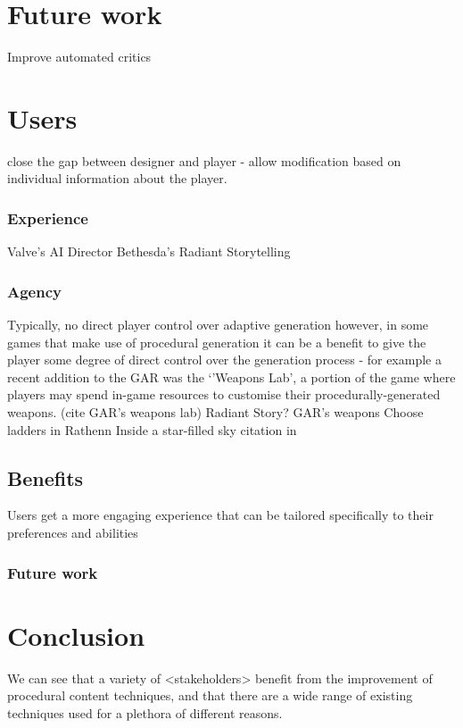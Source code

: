 \documentclass{acm_proc_article-sp}
\begin{document}
\section{Future work}
Improve automated critics \cite{hendrikx2012procedural}

\newpage
\section{Users}
close the gap between designer and player - allow modification based on individual information about the player.

\cite{sorenson2010towards}

\subsubsection{Experience}
Valve's AI Director \cite{valve}
Bethesda's Radiant Storytelling \cite{radiant}
\subsubsection{Agency}
Typically, no direct player control over adaptive generation \cite{hamlet}
however, in some games that make use of procedural generation it can be a benefit to give the player some degree of direct control over the generation process - for example a recent addition to the GAR was the `'Weapons Lab', a portion of the game where players may spend in-game resources to customise their procedurally-generated weapons. (cite GAR's weapons lab)
Radiant Story?
GAR's weapons
Choose ladders in Rathenn \cite{smith2011pcg}
Inside a star-filled sky citation in \cite{smith2011pcg}

\subsection{Benefits}
Users get a more engaging experience that can be tailored specifically to their preferences and abilities
\subsubsection{Future work}

\section{Conclusion}
We can see that a variety of <stakeholders> benefit from the improvement of procedural content techniques, and that there are a wide range of existing techniques used for a plethora of different reasons.

\newpage


\balancecolumns
\end{document}
